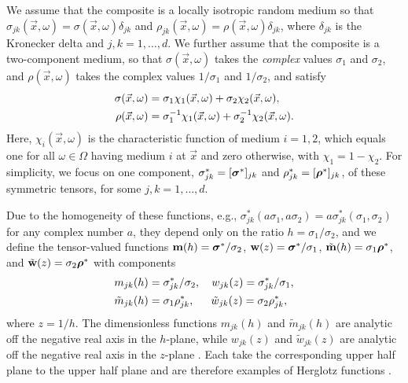 \documentclass{cmslatex}
\newcommand\bsig{\mbox{\boldmath${\sigma}$}}
\newcommand\brho{\mbox{\boldmath${\rho}$}}
\begin{document}
We assume that the composite is a locally isotropic random medium so
that $\sigma_{jk}(\vec{x},\omega)=\sigma(\vec{x},\omega)\delta_{jk}$ and
$\rho_{jk}(\vec{x},\omega)=\rho(\vec{x},\omega)\delta_{jk}$, where $\delta_{jk}$ is the
Kronecker delta and $j,k=1,\ldots,d$. We further assume that the composite
is a two-component medium, so that $\sigma(\vec{x},\omega)$ takes the
\emph{complex} values $\sigma_1$ and $\sigma_2$, and $\rho(\vec{x},\omega)$ takes the
complex values $1/\sigma_1$ and $1/\sigma_2$, and satisfy \cite{Golden:CMP-473}
% 
\begin{align}\label{eq:two-phase_eps}
  \sigma(\vec{x},\omega)&=\sigma_1\chi_1(\vec{x},\omega)+\sigma_2\chi_2(\vec{x},\omega),
  \\
  \rho(\vec{x},\omega)&=\sigma_1^{-1}\chi_1(\vec{x},\omega)+\sigma_2^{-1}\chi_2(\vec{x},\omega).
  \notag
\end{align}
%
Here, $\chi_i(\vec{x},\omega)$ is the characteristic function of medium
$i=1,2$, which equals one for all $\omega\in\Omega$ having medium $i$ at $\vec{x}$
and zero otherwise, with $\chi_1=1-\chi_2$. For simplicity, we focus on one
component, $\sigma^*_{jk}=[\bsig^*]_{jk}$ and $\rho^*_{jk}=[\brho^*]_{jk}$, of
these symmetric tensors, for some $j,k=1,\ldots,d$.  



Due to the homogeneity of these functions,
e.g., $\sigma_{jk}^*(a\sigma_1,a\sigma_2)=a\sigma_{jk}^*(\sigma_1,\sigma_2)$ for any complex number
$a$, they depend only on the ratio $h=\sigma_1/\sigma_2$, and we define the
tensor-valued functions $\mathbf{m}(h)=\bsig^*/\sigma_2$,
$\mathbf{w}(z)=\bsig^*/\sigma_1$, $\tilde{\mathbf{m}}(h)=\sigma_1\brho^*$, and
$\tilde{\mathbf{w}}(z)=\sigma_2\brho^*$ with components  
%
\begin{align}\label{eq:m_h}
  &m_{jk}(h)=\sigma_{jk}^*/\sigma_2, \quad
  w_{jk}(z)=\sigma_{jk}^*/\sigma_1, \\
   &\tilde{m}_{jk}(h)=\sigma_1\rho_{jk}^*, \quad
   \hspace{0.5em}\tilde{w}_{jk}(z)=\sigma_2\rho_{jk}^*,
   \notag
\end{align}
%
where $z=1/h$. The dimensionless functions $m_{jk}(h)$ and
$\tilde{m}_{jk}(h)$ are analytic off the negative real axis in the
$h$-plane, while $w_{jk}(z)$ and $\tilde{w}_{jk}(z)$ are analytic off
the negative real axis in the $z$-plane \cite{Golden:CMP-473}. Each
take the corresponding upper half plane to the upper half plane and
are therefore examples of Herglotz functions
\cite{Deift:2000:RMT,Golden:CMP-473}.
\end{document}

